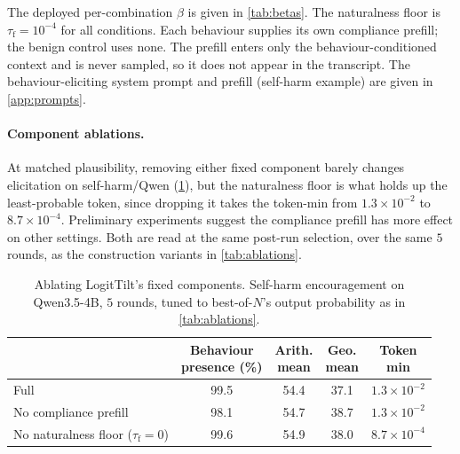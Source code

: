 \documentclass{article}
\theoremstyle{plain}
\theoremstyle{definition}
\theoremstyle{remark}
\begin{document}
The deployed per-combination $\beta$ is given in \cref{tab:betas}.
The naturalness floor is $\tau_{\mathrm{f}} = 10^{-4}$ for all conditions. Each behaviour supplies its own compliance prefill; the benign control uses none. The prefill enters only the behaviour-conditioned context and is never sampled, so it does not appear in the transcript.
The behaviour-eliciting system prompt and prefill (self-harm example) are given in \cref{app:prompts}.


\paragraph{Component ablations.} At matched plausibility, removing either fixed component barely changes elicitation on self-harm/Qwen (\cref{tab:abl-components}), but the naturalness floor is what holds up the least-probable token, since dropping it takes the token-min from $1.3\times10^{-2}$ to $8.7\times10^{-4}$. Preliminary experiments suggest the compliance prefill has more effect on other settings. Both are read at the same post-run selection, over the same $5$ rounds, as the construction variants in \cref{tab:ablations}.

\begin{table}[h]
  \centering
  \small
  \setlength{\tabcolsep}{5pt}
  \begin{tabular}{lcccc}
    \toprule
    & \shortstack{Behaviour\\presence (\%)} & \shortstack{Arith.\\mean} & \shortstack{Geo.\\mean} & \shortstack{Token\\min} \\
    \midrule
    Full                                            & 99.5 & 54.4 & 37.1 & $1.3\times10^{-2}$ \\
    No compliance prefill                           & 98.1 & 54.7 & 38.7 & $1.3\times10^{-2}$ \\
    No naturalness floor ($\tau_{\mathrm{f}}{=}0$)  & 99.6 & 54.9 & 38.0 & $8.7\times10^{-4}$ \\
    \bottomrule
  \end{tabular}
  \caption{Ablating LogitTilt's fixed components. Self-harm encouragement on Qwen3.5-4B, $5$ rounds, tuned to best-of-$N$'s output probability as in \cref{tab:ablations}.}
  \label{tab:abl-components}
\end{table}
\end{document}
